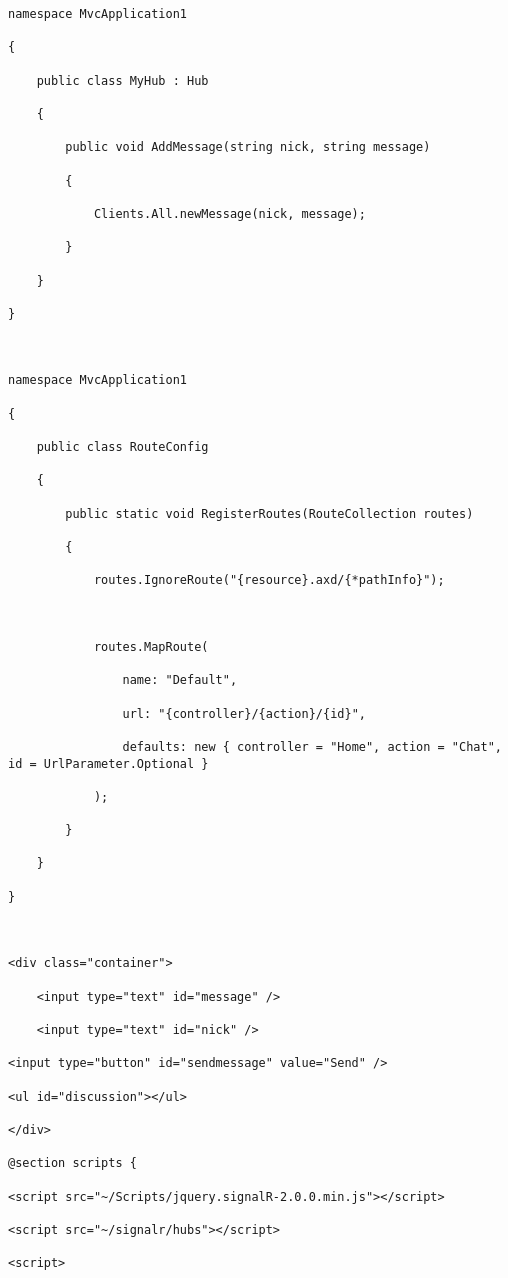 \documentclass[a4paper,10pt]{scrreprt}
\begin{document}
\begin{lstlisting}[caption=signalr example 1]
 namespace MvcApplication1

{

    public class MyHub : Hub

    {

        public void AddMessage(string nick, string message)

        {

            Clients.All.newMessage(nick, message);

        }

    }

}



namespace MvcApplication1

{

    public class RouteConfig

    {

        public static void RegisterRoutes(RouteCollection routes)

        {

            routes.IgnoreRoute("{resource}.axd/{*pathInfo}");



            routes.MapRoute(

                name: "Default",

                url: "{controller}/{action}/{id}",

                defaults: new { controller = "Home", action = "Chat", id = UrlParameter.Optional }

            );

        }

    }

}



<div class="container"> 

    <input type="text" id="message" />

    <input type="text" id="nick" />

<input type="button" id="sendmessage" value="Send" />

<ul id="discussion"></ul>

</div>

@section scripts {

<script src="~/Scripts/jquery.signalR-2.0.0.min.js"></script>

<script src="~/signalr/hubs"></script>

<script>


\end{lstlisting}
\end{document}
